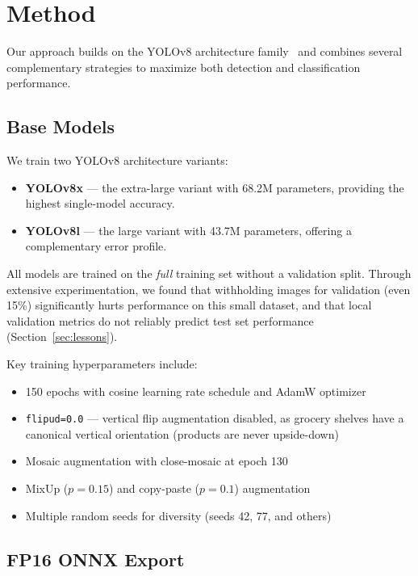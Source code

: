 \documentclass[11pt,a4paper]{article}
\begin{document}
\section{Method}
\label{sec:method}

Our approach builds on the YOLOv8 architecture family~\citep{jocher2023yolov8} and combines several complementary strategies to maximize both detection and classification performance.

\subsection{Base Models}
\label{sec:base_models}

We train two YOLOv8 architecture variants:
\begin{itemize}    \item \textbf{YOLOv8x} --- the extra-large variant with 68.2M parameters, providing the highest single-model accuracy.
    \item \textbf{YOLOv8l} --- the large variant with 43.7M parameters, offering a complementary error profile.
\end{itemize}

All models are trained on the \emph{full} training set without a validation split.
Through extensive experimentation, we found that withholding images for validation (even 15\%) significantly hurts performance on this small dataset, and that local validation metrics do not reliably predict test set performance (Section~\ref{sec:lessons}).

Key training hyperparameters include:
\begin{itemize}    \item 150 epochs with cosine learning rate schedule and AdamW optimizer
    \item \texttt{flipud=0.0} --- vertical flip augmentation disabled, as grocery shelves have a canonical vertical orientation (products are never upside-down)
    \item Mosaic augmentation with close-mosaic at epoch 130
    \item MixUp ($p=0.15$) and copy-paste ($p=0.1$) augmentation
    \item Multiple random seeds for diversity (seeds 42, 77, and others)
\end{itemize}

\subsection{FP16 ONNX Export}
\label{sec:onnx}
\end{document}

